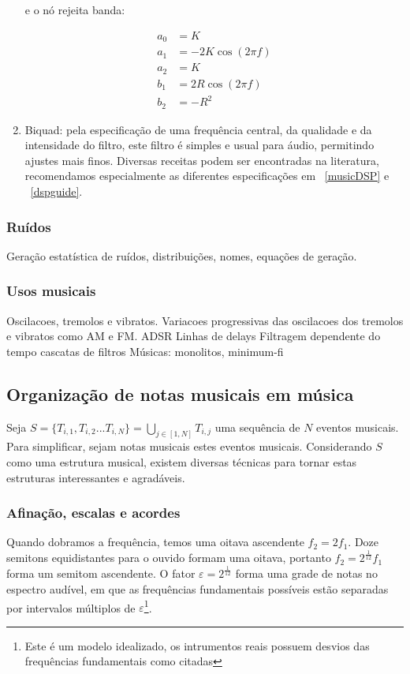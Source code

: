 \begin{enumerate}
e o nó rejeita banda:

\begin{equation}
\begin{split}
a_0 & =  K \\
a_1 & =  -2K\cos (2\pi f) \\
a_2 & =  K \\
b_1 & =  2R \cos (2\pi f) \\
b_2 & =  -R^2
\end{split}
\end{equation}


\item Biquad: pela especificação de uma frequência central, da qualidade
e da intensidade do filtro, este filtro é simples e usual para áudio,
permitindo ajustes mais finos. Diversas receitas podem ser encontradas
na literatura, recomendamos especialmente as diferentes especificações
em ~\ref{musicDSP} e ~\ref{dspguide}.

\end{enumerate}

\subsubsection{Ruídos}
Geração estatística de ruídos, distribuições, nomes, equações de geração.


\subsubsection{Usos musicais}
Oscilacoes, tremolos e vibratos. Variacoes
progressivas das oscilacoes dos tremolos e vibratos
como AM e FM.
ADSR
Linhas de delays
Filtragem dependente do tempo
cascatas de filtros
Músicas: monolitos, minimum-fi



\clearpage
\subsection{Organização de notas musicais em música}
Seja $ S=\{T_{i,1},T_{i,2}...T_{i,N}\} =\bigcup_{j \in [1,N]} T_{i,j} $ uma sequência de $N$ eventos
musicais. Para simplificar, sejam notas musicais estes eventos musicais.
Considerando $S$ como uma estrutura musical, existem diversas técnicas
para tornar estas estruturas interessantes e agradáveis.

\subsubsection{Afinação, escalas e acordes}
Quando dobramos a frequência, temos uma oitava ascendente $f_2=2f_1$.
Doze semitons equidistantes para o ouvido formam uma oitava,
portanto $f_2=2^{\frac{1}{12}}f_1$ forma um semitom ascendente.
O fator $\varepsilon=2^{\frac{1}{12}}$ forma uma grade de notas
no espectro audível, em que as frequências fundamentais possíveis
estão separadas por intervalos múltiplos de $\varepsilon$\footnote{Este
é um modelo idealizado, os intrumentos reais possuem desvios das frequências
fundamentais como citadas}.

